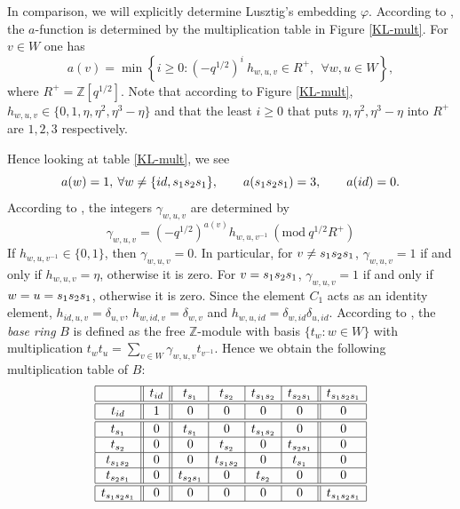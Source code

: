 \documentclass[oneside, a4paper, 11pt]{amsart}
\newcommand{\Z}{\mathbb{Z}}
\begin{document}
In comparison, we will explicitly determine Lusztig's embedding $\varphi$.
According to \cite[p.538]{Lusztig2}, the $a$-function is determined by the
multiplication table in Figure \ref{KL-mult}. For $v\in W$ one has
$$a(v) = \min \left\{ i\geq 0 :   (-q^{1/2})^i \: h_{w,u,v}
  \in R^+,  \:  \: \forall w,u\in W  \right\},$$
where $R^+ = \Z[q^{1/2}]$.
Note that according to Figure \ref{KL-mult},  $h_{w,u,v} \in \{0,1,\eta,\eta^2,
\eta^3-\eta\}$ and that the least $i\geq 0$ that puts $\eta, \eta^2,
\eta^3-\eta$  into $R^+$ are $1,2,3$ respectively.

Hence looking at table \ref{KL-mult}, we see
$$a(w)=1,\: \forall w\neq \{id, s_1s_2s_1\}, \qquad  a(s_1s_2s_1)=3, \qquad
a(id)=0.$$
According to \cite[p.538]{Lusztig2}, the integers  $\gamma_{w,u,v}$ are
determined by
$$ \gamma_{w,u,v} = \left(-q^{1/2}\right)^{a(v)} h_{w,u,v^{-1}} \:
(\mathrm{mod}\: q^{1/2}R^+)$$
If $h_{w,u,v^{-1}}\in\{0,1\}$, then $\gamma_{w,u,v}=0$.  In particular, for
$v\neq s_1s_2s_1$,
$\gamma_{w,u,v} = 1$ if and only if $h_{w,u,v}=\eta$, otherwise it is zero. For
$v=s_1s_2s_1$, $\gamma_{w,u,v} = 1$ if and only if $w=u=s_1s_2s_1$, otherwise
it is zero. Since the element $C_{1}$ acts as an identity element,
$h_{id,u,v}= \delta_{u,v}$, $h_{w,id,v} = \delta_{w,v}$ and $h_{w,u,id}=
\delta_{w,id}\delta_{u,id}$.
According to \cite[2.3]{Lusztig2}, the \emph{base ring} $B$ is defined as the
free $\Z$-module with basis $\{t_w : w\in W\}$ with multiplication $ t_wt_u =
\sum_{v\in W} \gamma_{w,u,v} t_{v^{-1}}.$
Hence we obtain the following multiplication table of $B$:
$$\begin{array}{|c||c||c|c|c|c||c|}\hline
          &  t_{id} & t_{s_1}        & t_{s_2}          & t_{s_1s_2}          & t_{s_2s_1}                  & t_{s_1s_2s_1}\\\hline\hline
t_{id}    & 1  & 0        & 0          & 0          & 0                  & 0\\\hline\hline
     t_{s_1}  &  0 &t_{s_1}     & 0         & t_{s_1s_2}      & 0           & 0 \\\hline
t_{s_2}  &  0& 0        & t_{s_2}      & 0   & t_{s_2s_1}              & 0 \\\hline
t_{s_1s_2} &  0&0 & t_{s_1s_2}     & 0  & t_{s_1}   & 0 \\\hline
t_{s_2s_1} & 0&t_{s_2s_1}     & 0 & t_{s_2}  & 0 & 0 \\\hline\hline
t_{s_1s_2s_1} &0& 0   & 0  & 0  & 0    & t_{s_1s_2s_1} \\\hline
\end{array}$$
\end{document}
